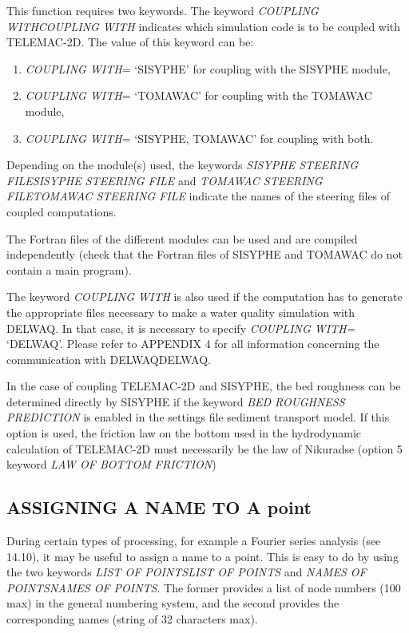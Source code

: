 \documentclass{article} %
\begin{document}
 This function requires two keywords. The keyword \textit{COUPLING WITHCOUPLING WITH} indicates which simulation code is to be coupled with TELEMAC-2D. The value of this keyword can be:

\begin{enumerate}
\item  \textit{COUPLING WITH}= `SISYPHE' for coupling with the SISYPHE module,

\item  \textit{COUPLING WITH}= `TOMAWAC' for coupling with the TOMAWAC module,

\item  \textit{COUPLING WITH}= `SISYPHE, TOMAWAC' for coupling with both.
\end{enumerate}

 Depending on the module(s) used, the keywords \textit{SISYPHE STEERING FILESISYPHE STEERING FILE }and\textit{ TOMAWAC STEERING FILETOMAWAC STEERING FILE} indicate the names of the steering files of coupled computations.

 The Fortran files of the different modules can be used and are compiled independently (check that the Fortran files of SISYPHE and TOMAWAC do not contain a main program).

 The keyword \textit{COUPLING WITH} is also used if the computation has to generate the appropriate files necessary to make a water quality simulation with DELWAQ. In that case, it is necessary to specify \textit{COUPLING WITH= }`DELWAQ'. Please refer to APPENDIX 4 for all information concerning the communication with DELWAQDELWAQ.

 In the case of coupling TELEMAC-2D and SISYPHE, the bed roughness can be determined directly by SISYPHE if the keyword \textit{BED ROUGHNESS PREDICTION }is enabled in the settings file sediment transport model. If this option is used, the friction law on the bottom used in the hydrodynamic calculation of TELEMAC-2D must necessarily be the law of Nikuradse (option 5 keyword \textit{LAW OF BOTTOM FRICTION})


\subsection{ ASSIGNING A NAME TO A point}

 During certain types of processing, for example a Fourier series analysis (see 14.10), it may be useful to assign a name to a point. This is easy to do by using the two keywords \textit{LIST OF POINTSLIST OF POINTS} and \textit{NAMES OF POINTSNAMES OF POINTS}. The former provides a list of node numbers (100 max) in the general numbering system, and the second provides the corresponding names (string of 32 characters max).
\end{document}
